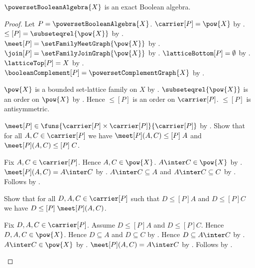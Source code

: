 \begin{theorem}\label{powerset_boolean_algebra_is_exact_boolean_algebra}
    $\powersetBooleanAlgebra{X}$ is an exact Boolean algebra.
\end{theorem}
\begin{proof}
    Let $P=\powersetBooleanAlgebra{X}$.
    $\carrier[P]=\pow{X}$ by .
    $\leq[P]=\subseteqrel{\pow{X}}$ by
        .
    $\meet[P]=\setFamilyMeetGraph{\pow{X}}$ by
        .
    $\join[P]=\setFamilyJoinGraph{\pow{X}}$ by
        .
    $\latticeBottom[P]=\emptyset$ by
        .
    $\latticeTop[P]=X$ by .
    $\booleanComplement[P]=\powersetComplementGraph{X}$ by
        .

    $\pow{X}$ is a bounded set-lattice family on $X$ by
        .
    $\subseteqrel{\pow{X}}$ is an order on $\pow{X}$ by
        .
    Hence $\leq[P]$ is an order on $\carrier[P]$.
    $\leq[P]$ is antisymmetric.

    $\meet[P]\in
        \funs{\carrier[P]\times\carrier[P]}{\carrier[P]}$ by
        .
    Show that for all $A,C\in\carrier[P]$ we have
        $\meet[P](A,C)\mathrel{\leq[P]}A$ and
        $\meet[P](A,C)\mathrel{\leq[P]}C$.
    \begin{subproof}
        Fix $A,C\in\carrier[P]$.
        Hence $A,C\in\pow{X}$.
        $A\inter C\in\pow{X}$ by .
        $\meet[P](A,C)=A\inter C$ by
            .
        $A\inter C\subseteq A$ and $A\inter C\subseteq C$ by
            .
        Follows by
            .
    \end{subproof}
    Show that for all $D,A,C\in\carrier[P]$ such that
        $D\mathrel{\leq[P]}A$ and $D\mathrel{\leq[P]}C$ we have
        $D\mathrel{\leq[P]}\meet[P](A,C)$.
    \begin{subproof}
        Fix $D,A,C\in\carrier[P]$.
        Assume $D\mathrel{\leq[P]}A$ and $D\mathrel{\leq[P]}C$.
        Hence $D,A,C\in\pow{X}$.
        Hence $D\subseteq A$ and $D\subseteq C$ by
            .
        Hence $D\subseteq A\inter C$ by .
        $A\inter C\in\pow{X}$ by .
        $\meet[P](A,C)=A\inter C$ by
            .
        Follows by
            .
    \end{subproof}


\end{proof}
